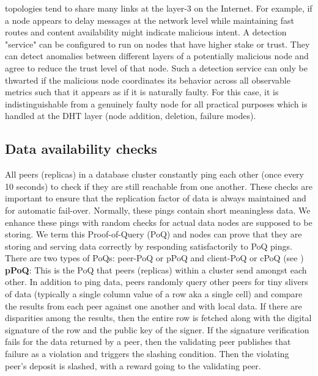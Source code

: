 topologies tend to share many links at the layer-3 on the Internet. For example, if a node appears to delay messages at
the network level while maintaining fast routes and content availability might indicate malicious intent. A detection
"service" can be configured to run on nodes that have higher stake or trust. They can detect anomalies between different
layers of a potentially malicious node and agree to reduce the trust level of that node. Such a detection service can
only be thwarted if the malicious node coordinates its behavior across all observable metrics such that it appears as if
it is naturally faulty. For this case, it is indistinguishable from a genuinely faulty node for all practical purposes
which is handled at the DHT layer (node addition, deletion, failure modes).

\subsection{Data availability checks} \label{sec:poq}
All peers (replicas) in a database cluster constantly ping each other (once every 10 seconds) to check if they are still reachable from one another. These checks are important to ensure that the replication factor of data is always maintained and for automatic fail-over. Normally, these pings contain short meaningless data. We enhance these pings with random checks for actual data nodes are supposed to be storing. We term this \textsf{Proof-of-Query (PoQ)} and nodes can prove that they are storing and serving data correctly by responding satisfactorily to \textsf{PoQ} pings. There are two types of \textsf{PoQ}s: \textsf{peer-PoQ or pPoQ} and \textsf{client-PoQ or cPoQ} (see )
\newline
\newline
\textbf{pPoQ}: This is the \textsf{PoQ} that peers (replicas) within a cluster send amongst each other. In addition to ping data, peers randomly query other peers for tiny slivers of data (typically a single column value of a row aka a single cell) and compare the results from each peer against one another and with local data. If there are disparities among the results, then the entire row is fetched along with the digital signature of the row and the public key of the signer. If the signature verification fails for the data returned by a peer, then the validating peer publishes that failure as a violation and triggers the slashing condition. Then the violating peer's deposit is slashed, with a reward going to the validating peer.
\newline
